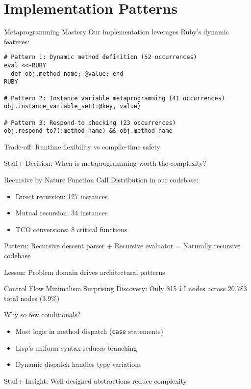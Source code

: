 \documentclass[presentation,aspectratio=169]{beamer}
\begin{document}
\section{Implementation Patterns}
\label{sec:org84fc890}

\begin{frame}[label={sec:orgb612dcc},fragile]{Metaprogramming Mastery}
 Our implementation leverages Ruby's dynamic features:

\begin{verbatim}
# Pattern 1: Dynamic method definition (52 occurrences)
eval <<-RUBY
  def obj.method_name; @value; end
RUBY

# Pattern 2: Instance variable metaprogramming (41 occurrences)  
obj.instance_variable_set(:@key, value)

# Pattern 3: Respond-to checking (23 occurrences)
obj.respond_to?(:method_name) && obj.method_name
\end{verbatim}

\alert{Trade-off}: Runtime flexibility vs compile-time safety

\alert{Staff+ Decision}: When is metaprogramming worth the complexity?
\end{frame}
\begin{frame}[label={sec:org580cfc4}]{Recursive by Nature}
\alert{Function Call Distribution} in our codebase:
\begin{itemize}
\item Direct recursion: 127 instances
\item Mutual recursion: 34 instances
\item TCO conversions: 8 critical functions
\end{itemize}

\pause

\alert{Pattern}: Recursive descent parser + Recursive evaluator = Naturally recursive codebase

\alert{Lesson}: Problem domain drives architectural patterns
\end{frame}
\begin{frame}[label={sec:orgd8051f8},fragile]{Control Flow Minimalism}
 \alert{Surprising Discovery}: Only 815 \texttt{if} nodes across 20,783 total nodes (3.9\%)

\pause

\alert{Why so few conditionals?}
\begin{itemize}
\item Most logic in method dispatch (\texttt{case} statements)
\item Lisp's uniform syntax reduces branching
\item Dynamic dispatch handles type variations
\end{itemize}

\pause

\alert{Staff+ Insight}: Well-designed abstractions reduce complexity
\end{frame}
\end{document}
